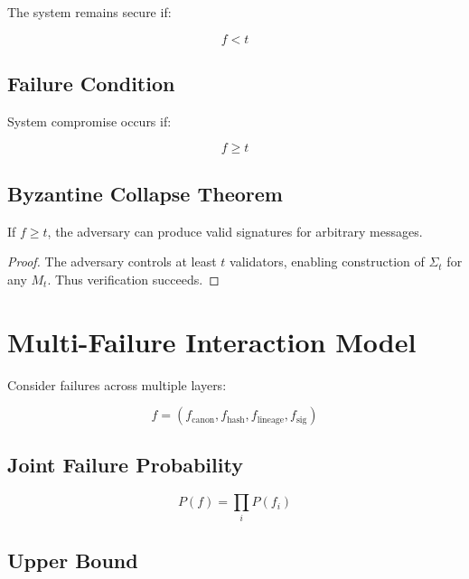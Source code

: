 The system remains secure if:

\begin{equation}
f < t
\end{equation}

\subsection{Failure Condition}

System compromise occurs if:

\begin{equation}
f \geq t
\end{equation}

\subsection{Byzantine Collapse Theorem}

\begin{theorem}
If $f \geq t$, the adversary can produce valid signatures for arbitrary messages.
\end{theorem}

\begin{proof}
The adversary controls at least $t$ validators, enabling construction of $\Sigma_t$ for any $M_t$. Thus verification succeeds.
\end{proof}

\section{Multi-Failure Interaction Model}

Consider failures across multiple layers:

\begin{equation}
f = (f_{\text{canon}}, f_{\text{hash}}, f_{\text{lineage}}, f_{\text{sig}})
\end{equation}

\subsection{Joint Failure Probability}

\begin{equation}
P(f) = \prod_{i} P(f_i)
\end{equation}

\subsection{Upper Bound}

